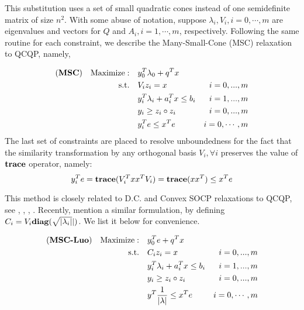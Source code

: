 \documentclass[../main]{subfiles}
\begin{document}
This substitution uses a set of small quadratic cones instead of one semidefinite matrix of size \(n^2\). With some abuse of notation, suppose \(\lambda_i, V_i, i = 0, \cdots, m\) are eigenvalues and vectors for \(Q\) and \(A_i, i = 1,
\cdots, m\), respectively. Following the same routine for each constraint, we describe the Many-Small-Cone (MSC) relaxation to QCQP, namely,

\begin{equation}\label{eq.rel.msc}
  \begin{aligned}
    (\textbf{MSC}) \quad \mathrm{Maximize: }\quad & y_0 ^T\lambda_0 + q^Tx                              \\
    \mathrm{s.t.} \quad                        & V_i z_i = x                        & i=0,...,m      \\
                                               & y_i ^T\lambda_i  + a_i^Tx  \le b_i & i=1,...,m      \\
                                               & y_i \ge z_i \circ z_i              & i=0,...,m      \\
                                               & y_i^Te \le x^Te                    & i=0, \cdots, m
  \end{aligned}
\end{equation}
The last set of constraints are placed to resolve unboundedness for the fact that the similarity transformation by any orthogonal basis \(V_i, \forall i\) preserves the value of \(\mathbf{trace}\) operator, namely:
\begin{equation}
  y_i^Te = \mathbf{trace}( V_i^Txx^T V_i) = \mathbf{trace} (xx^T) \le x^Te
\end{equation}

This method is closely related to D.C. and Convex SOCP relaxations to QCQP, see \cite{zheng_convex_2011}, \cite{zheng_nonconvex_2011}, \cite{jiang_simultaneous_2016}, \cite{ye_new_2003}. Recently, \cite{luo_new_2019} mention a similar formulation, by defining \(C_i = V_i\mathbf{diag}(\sqrt{|\lambda_i|}|)\). We list it below for convenience.

\begin{equation}
  \begin{aligned} \label{eq.rel.luo}
    (\textbf{MSC-Luo})\quad \mathrm{Maximize: }\quad & y_0 ^Te + q^Tx                                      \\
    \mathrm{s.t.} \quad                           & C_i z_i = x                        & i=0,...,m      \\
                                                  & y_i ^T\lambda_i  + a_i^Tx  \le b_i & i=1,...,m      \\
                                                  & y_i \ge z_i \circ z_i              & i=0,...,m      \\
                                                  & y^T\frac{1}{|\lambda|}  \le x^Te   & i=0, \cdots, m
  \end{aligned}
\end{equation}
\end{document}
